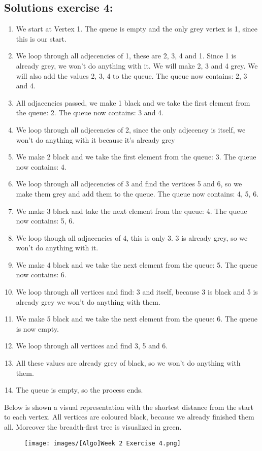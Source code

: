 \documentclass{article}
\begin{document}
\subsection*{Solutions exercise 4:}

\begin{enumerate}
\item We start at Vertex 1. The queue is empty and the only grey vertex is 1, since this is our start.
\item We loop through all adjecencies of 1, these are 2, 3, 4 and 1. Since 1 is already grey, we won’t do anything with it. We will make 2, 3 and 4 grey. We will also add the values 2, 3, 4 to the queue. The queue now contains: 2, 3 and 4.
\item All adjacencies passed, we make 1 black and we take the first element from the queue: 2. The queue now contains: 3 and 4.
\item We loop through all adjecencies of 2, since the only adjecency is itself, we won’t do anything with it because it’s already grey
\item We make 2 black and we take the first element from the queue: 3. The queue now contains: 4.
\item We loop through all adjecencies of 3 and find the vertices 5 and 6, so we make them grey and add them to the queue. The queue now contains: 4, 5, 6.
\item We make 3 black and take the next element from the queue: 4. The queue now contains: 5, 6.
\item We loop though all adjacencies of 4, this is only 3. 3 is already grey, so we won’t do anything with it.
\item We make 4 black and we take the next element from the queue: 5. The queue now contains: 6.
\item We loop through all vertices and find: 3 and itself, because 3 is black and 5 is already grey we won’t do anything with them.
\item We make 5 black and we take the next element from the queue: 6. The queue is now empty.
\item We loop through all vertices and find 3, 5 and 6. \item All these values are already grey of black, so we won’t do anything with them.
\item The queue is empty, so the process ends.
\end{enumerate}

Below is shown a visual representation with the shortest distance from the start to each vertex. All vertices are coloured black, because we already finished them all. Moreover the breadth-first tree is visualized in green.
\vspace*{-0.4cm}
\begin{figure}[h!]
\centering
\texttt{[image: images/[Algo]Week 2 Exercise 4.png]}
\end{figure}
\vspace*{-1cm}
\end{document}
